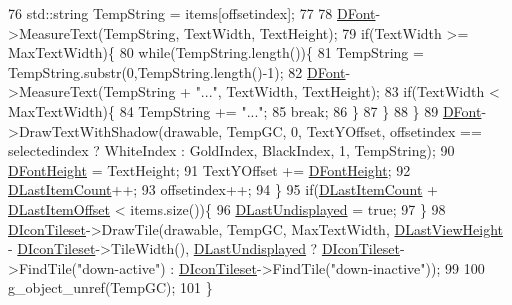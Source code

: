 \begin{DoxyCode}
76         std::string TempString = items[offsetindex];
77         
78         \hyperlink{classCListViewRenderer_a1fc512e6dd37dba02b6e6fa5800ef222}{DFont}->MeasureText(TempString, TextWidth, TextHeight);
79         \textcolor{keywordflow}{if}(TextWidth >= MaxTextWidth)\{
80             \textcolor{keywordflow}{while}(TempString.length())\{
81                 TempString = TempString.substr(0,TempString.length()-1);
82                 \hyperlink{classCListViewRenderer_a1fc512e6dd37dba02b6e6fa5800ef222}{DFont}->MeasureText(TempString + \textcolor{stringliteral}{"..."}, TextWidth, TextHeight);
83                 \textcolor{keywordflow}{if}(TextWidth < MaxTextWidth)\{
84                     TempString += \textcolor{stringliteral}{"..."};
85                     \textcolor{keywordflow}{break};
86                 \}
87             \}
88         \}
89         \hyperlink{classCListViewRenderer_a1fc512e6dd37dba02b6e6fa5800ef222}{DFont}->DrawTextWithShadow(drawable, TempGC, 0, TextYOffset, offsetindex == selectedindex ? 
      WhiteIndex : GoldIndex, BlackIndex, 1, TempString);
90         \hyperlink{classCListViewRenderer_a4d5e792e525ca2df01f0300bfe1248af}{DFontHeight} = TextHeight;
91         TextYOffset += \hyperlink{classCListViewRenderer_a4d5e792e525ca2df01f0300bfe1248af}{DFontHeight};
92         \hyperlink{classCListViewRenderer_a087155c29c7ac3a830f6645af590ed94}{DLastItemCount}++;
93         offsetindex++;    
94     \}
95     \textcolor{keywordflow}{if}(\hyperlink{classCListViewRenderer_a087155c29c7ac3a830f6645af590ed94}{DLastItemCount} + \hyperlink{classCListViewRenderer_ad6b2b0052b8f74e3198fbfb39900b4e3}{DLastItemOffset} < items.size())\{
96         \hyperlink{classCListViewRenderer_ad08a63dfe697395050c5af2ce4479aa2}{DLastUndisplayed} = \textcolor{keyword}{true};    
97     \}
98     \hyperlink{classCListViewRenderer_af6e36f127e551dd54c01f8df0fadeb9c}{DIconTileset}->DrawTile(drawable, TempGC, MaxTextWidth, 
      \hyperlink{classCListViewRenderer_a7f74a3883638efee557cde501d47ee70}{DLastViewHeight} - \hyperlink{classCListViewRenderer_af6e36f127e551dd54c01f8df0fadeb9c}{DIconTileset}->TileWidth(), 
      \hyperlink{classCListViewRenderer_ad08a63dfe697395050c5af2ce4479aa2}{DLastUndisplayed} ? \hyperlink{classCListViewRenderer_af6e36f127e551dd54c01f8df0fadeb9c}{DIconTileset}->FindTile(\textcolor{stringliteral}{"down-active"}) : 
      \hyperlink{classCListViewRenderer_af6e36f127e551dd54c01f8df0fadeb9c}{DIconTileset}->FindTile(\textcolor{stringliteral}{"down-inactive"}));
99     
100     g\_object\_unref(TempGC);
101 \}
\end{DoxyCode}
\hypertarget{classCListViewRenderer_a36438b9987f7c751d33c6fe322843979}{}\label{classCListViewRenderer_a36438b9987f7c751d33c6fe322843979} 

